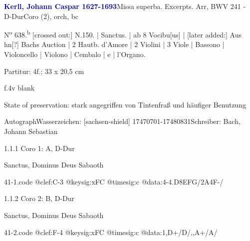 \documentclass[a4paper, twocolumn, 11pt]{book}
\begin{document}
\par \vspace{16pt} \textcolor{darkblue}{\textbf{Kerll, Johann Caspar  1627-1693}}\hfillplus{[41]}\newline Missa superba. Excerpts. Arr, BWV 241 - D-Dur\newline Coro (2), orch, bc
\par \begin{itshape} N\textsuperscript{o} 638.\textsuperscript{b} [crossed out:] N.150. | Sanctus. | ab 8 Vocibu[us] | [later added:] Aus hn[?] Bachs Auction | 2 Hautb. d'Amore | 2 Violini | 3 Viole | Bassono | Violoncello | Violono | Cembalo | e | l'Organo.\end{itshape} 
\par \textcolor{darkblue}{}  Partitur: 4f.; 33 x 20,5 cm\newline \begin{small} f.4v blank\end{small} \newline \begin{small} State of preservation: stark angegriffen von Tintenfraß und häufiger Benutzung\end{small} \newline Autograph\newline Wasserzeichen: [sachsen-shield]  17470701-17480831\newline Schreiber: Bach, Johann Sebastian
\par 1.1.1  Coro 1: A, D-Dur\newline \begin{footnotesize} Sanctus, Dominus Deus Sabaoth \end{footnotesize}  
\begin{filecontents*}{41-1.code}
@clef:C-3
@keysig:xFC
@timesig:c
@data:4-4.D{8EFG}/2A4F-/
\end{filecontents*}
\newline %
\par 1.1.2  Coro 2: B, D-Dur\newline \begin{footnotesize} Sanctus, Dominus Deus Sabaoth \end{footnotesize}  
\begin{filecontents*}{41-2.code}
@clef:F-4
@keysig:xFC
@timesig:c
@data:1,D+/D/,,A+/A/
\end{filecontents*}
\end{document}
